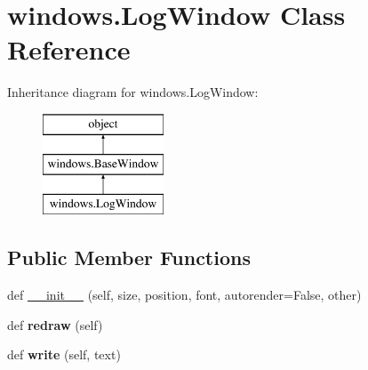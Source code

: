 \hypertarget{classwindows_1_1_log_window}{}\section{windows.\+Log\+Window Class Reference}
\label{classwindows_1_1_log_window}
Inheritance diagram for windows.\+Log\+Window\+:\begin{figure}[H]
\begin{center}
\leavevmode
\includegraphics[height=3.000000cm]{classwindows_1_1_log_window}
\end{center}
\end{figure}
\subsection*{Public Member Functions}
\begin{DoxyCompactItemize}
\item 
def \hyperlink{classwindows_1_1_log_window_aba59b52e6ce2eb65a796ebe9e5912fc4}{\+\_\+\+\_\+init\+\_\+\+\_\+} (self, size, position, font, autorender=False, other)
\item 
\hypertarget{classwindows_1_1_log_window_ae8757a6ec340043f2cb88764e9d267ff}{}def {\bfseries redraw} (self)\label{classwindows_1_1_log_window_ae8757a6ec340043f2cb88764e9d267ff}

\item 
\hypertarget{classwindows_1_1_log_window_a2a2daadc6b06e26e988acc28377e3eae}{}def {\bfseries write} (self, text)\label{classwindows_1_1_log_window_a2a2daadc6b06e26e988acc28377e3eae}

\end{DoxyCompactItemize}
